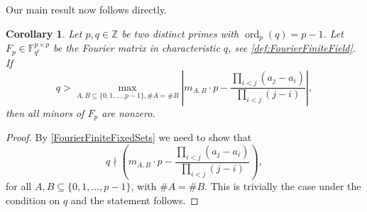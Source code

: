 \documentclass[a4paper]{article}
\newcommand{\Z}{\ensuremath{\mathbb{Z}}}
\newcommand{\F}{\mathbb{F}}
\newcommand{\ord}{\operatorname{ord}}
\renewcommand{\P}{\mathbb{P}}
\newtheorem{corollary}[theorem]{Corollary}
\newenvironment{Corollary}{\goodbreak \begin{corollary}\rmfamily}{\end{corollary}}
\numberwithin{equation}{section}
\numberwithin{table}{section}
\numberwithin{figure}{section}
\begin{document}
Our main result now follows directly.


\begin{Corollary}\label{FourierfiniteGreater}
    Let $p,q \in \Z$ be two distinct primes with $\ord_p(q)=p-1$.
    Let $F_p \in \F_{q^r}^{p \times p}$ be the Fourier matrix in characteristic $q$, see \cref{def:FourierFiniteField}.
    If
    \[
    q > \max_{A,B \subseteq \{0,1,\ldots,p-1\}, \#A=\#B} \left| m_{A,B} \cdot p - \frac{\prod_{i<j}(a_j-a_i)}{\prod_{i<j}(j-i)}\right|,
    \]
    then all minors of $F_p$ are nonzero.    
\end{Corollary}

\begin{proof}
    By \cref{FourierFiniteFixedSets} we need to show that
    \[
    q \nmid  \left( m_{A,B} \cdot p - \frac{\prod_{i<j}(a_j-a_i)}{\prod_{i<j}(j-i)}\right),
    \]
    for all $A,B \subseteq \{0,1,\ldots,p-1\}$, with $\#A=\#B$. This is trivially the case under the condition on $q$ and the statement follows.
\end{proof}

\end{document}

